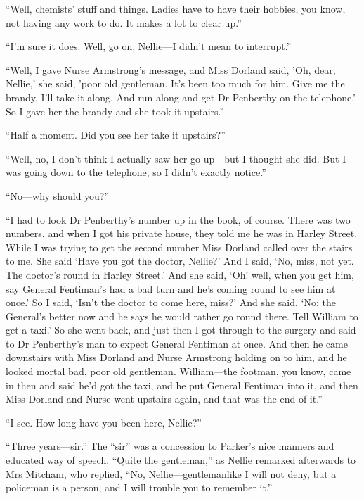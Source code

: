 \enquote{Well, chemists' stuff and things. Ladies have to have their hobbies, you know, not having any work to do. It makes a lot to clear up.}

\enquote{I'm sure it does. Well, go on, Nellie\allowbreak---\allowbreak I didn't mean to interrupt.}

\enquote{Well, I gave Nurse Armstrong's message, and Miss Dorland said, 'Oh, dear, Nellie,' she said, 'poor old gentleman. It's been too much for him. Give me the brandy, I'll take it along. And run along and get Dr Penberthy on the telephone.' So I gave her the brandy and she took it upstairs.}

\enquote{Half a moment. Did you see her take it upstairs?}

\enquote{Well, no, I don't think I actually saw her go up\allowbreak---\allowbreak but I thought she did. But I was going down to the telephone, so I didn't exactly notice.}

\enquote{No\allowbreak---\allowbreak why should you?}

\enquote{I had to look Dr Penberthy's number up in the book, of course. There was two numbers, and when I got his private house, they told me he was in Harley Street. While I was trying to get the second number Miss Dorland called over the stairs to me. She said \enquote{Have you got the doctor, Nellie?} And I said, \enquote{No, miss, not yet. The doctor's round in Harley Street.} And she said, \enquote{Oh! well, when you get him, say General Fentiman's had a bad turn and he's coming round to see him at once.} So I said, \enquote{Isn't the doctor to come here, miss?} And she said, \enquote{No; the General's better now and he says he would rather go round there. Tell William to get a taxi.} So she went back, and just then I got through to the surgery and said to Dr Penberthy's man to expect General Fentiman at once. And then he came downstairs with Miss Dorland and Nurse Armstrong holding on to him, and he looked mortal bad, poor old gentleman. William\allowbreak---\allowbreak the footman, you know, came in then and said he'd got the taxi, and he put General Fentiman into it, and then Miss Dorland and Nurse went upstairs again, and that was the end of it.}

\enquote{I see. How long have you been here, Nellie?}

\enquote{Three years\allowbreak---\allowbreak sir.} The \enquote{sir} was a concession to Parker's nice manners and educated way of speech. \enquote{Quite the gentleman,} as Nellie remarked afterwards to Mrs Mitcham, who replied, \enquote{No, Nellie\allowbreak---\allowbreak gentlemanlike I will not deny, but a policeman is a person, and I will trouble you to remember it.}

